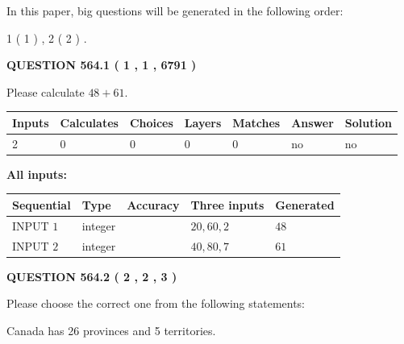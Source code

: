\documentclass[12pt]{article}
\begin{document}
In this paper, big questions will be generated in the following order: 
   
   
   1 ( 1 )
 ,
   2 ( 2 )
 .
  
\vspace{0.2in}
  
{\textbf{\Large{QUESTION
564.1 
 ( 1 , 1 , 6791 )
}}}
  
  
 
Please calculate $ %
48 +  %
61 $.
 
 
   
   
   
   
\noindent\begin{tabular}{|l|l|l|l|l|l|l|}
 \hline
Inputs & Calculates & Choices & Layers & Matches & Answer & Solution \\ \hline
 2  & 
 0  & 
 0
  & 
 0  & 
 0  & 
  no & 
  no 
  \\ \hline
 \end{tabular}
   
   
   
   
\noindent{}
   
   
   
   
\noindent\vspace{0.1in}\hspace{-0.08in} {\textbf{\Large{All inputs: }}}
   
   
  
  
\noindent\begin{tabular}{|l|l|l|l|l|}
\hline
 Sequential & Type & Accuracy & Three inputs & Generated \\ 
\hline
 
 
  INPUT $  1 $ & integer &  & $
 20
 , 
 60
 , 
 2
 $ & $ 48 $ 
 \\  \hline  
 
 
  INPUT $  2 $ & integer &  & $
 40
 , 
 80
 , 
 7
 $ & $ 61 $ 
 \\  \hline  
 \end{tabular}
   
   
  
\vspace{0.2in}
  
{\textbf{\Large{QUESTION
564.2 
 ( 2 , 2 , 3 )
}}}
  
  
Please choose the correct one from the following statements:
 
 
Canada has  26 provinces and  5 territories.
 
\end{document}
